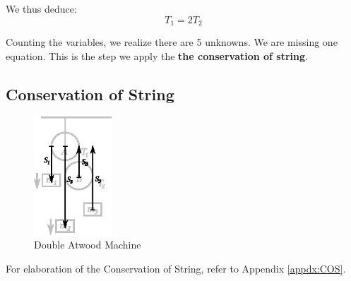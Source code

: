\documentclass[11pt]{article}
\begin{document}
	We thus deduce:
	\begin{equation}
		T_1 = 2 T_2 \label{eqn:tension}
	\end{equation}
	
	Counting the variables, we realize there are 5 unknowns. We are missing one equation. This is the step we apply the \textbf{the conservation of string}.
	
	\subsection*{Conservation of String}
	\begin{figure}
		\centering
		\vspace{-0.7cm}
		\includegraphics[width=2.9cm]{cos.eps}
		\vspace{-0.3cm}
		\caption{Double Atwood Machine}
		\label{fig:conservationOfString}
		\vspace{-3cm}
	\end{figure}

	For elaboration of the Conservation of String, refer to Appendix \ref{appdx:COS}. 	
\end{document}
